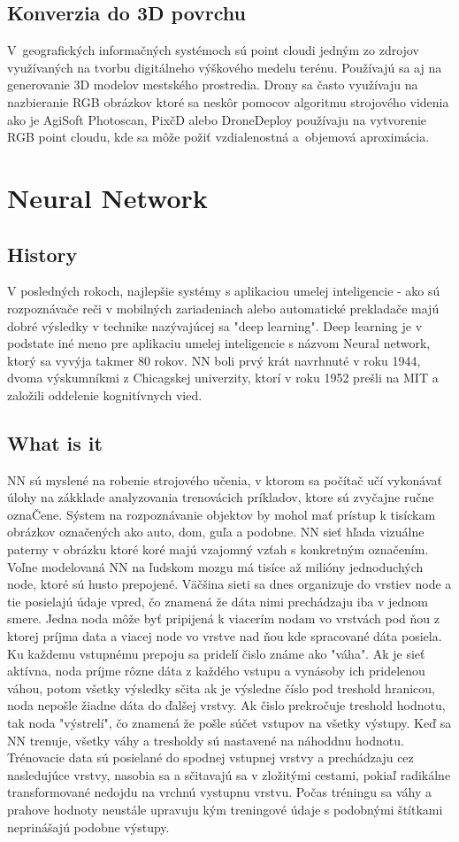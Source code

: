 \subsection{Konverzia do 3D povrchu}
V geografických informačných systémoch sú point cloudi jedným zo zdrojov využívaných na tvorbu digitálneho výškového medelu terénu. Používajú sa aj na generovanie 3D modelov mestského prostredia. Drony sa často využívaju na nazbieranie RGB obrázkov ktoré sa neskôr pomocov algoritmu strojového videnia ako je AgiSoft Photoscan, PixčD alebo DroneDeploy používaju na vytvorenie RGB point cloudu, kde sa môže požiť vzdialenostná a objemová aproximácia.
\section{Neural Network}
\subsection{History}
V posledných rokoch, najlepšie systémy s aplikaciou umelej inteligencie - ako sú rozpoznávače reči v mobilných zariadeniach alebo automatické prekladače majú dobré výsledky v technike nazývajúcej sa "deep learning".
Deep learning je v podstate iné meno pre aplikaciu umelej inteligencie s názvom Neural network, ktorý sa vyvýja takmer 80 rokov. NN boli prvý krát navrhnuté v roku 1944, dvoma výskumníkmi z Chicagskej univerzity, ktorí v roku 1952 prešli na MIT a založili oddelenie kognitívnych vied.
\subsection{What is it}
NN sú myslené na robenie strojového učenia, v ktorom sa počítač učí vykonávať úlohy na zákklade analyzovania trenovácich príkladov, ktore sú zvyčajne ručne oznaČene. Sýstem na rozpoznávanie objektov by mohol mať prístup k tisíckam obrázkov označených ako auto, dom, guľa a podobne. NN sieť hľada vizuálne paterny v obrázku ktoré koré majú vzajomný vzťah s konkretným označením.
Voľne modelovaná NN na ľudskom mozgu má tisíce až milióny jednoduchých node, ktoré sú husto prepojené. Väčšina sieti sa dnes organizuje do vrstiev node a tie posielajú údaje vpred, čo znamená že dáta nimi prechádzaju iba v jednom smere. Jedna noda môže byť pripijená k viacerím nodam vo vrstvách pod ňou z ktorej príjma data a viacej node vo vrstve nad ňou kde spracované dáta posiela.
Ku každemu vstupnému prepoju sa pridelí čislo známe ako "váha". Ak je sieť aktívna, noda príjme rôzne dáta z každého vstupu a vynásoby ich pridelenou váhou, potom všetky výsledky sčita ak je výsledne číslo pod treshold hranicou, noda nepošle žiadne dáta do ďalšej vrstvy. Ak čislo prekročuje treshold hodnotu, tak noda "výstrelí", čo znamená že pošle súčet vstupov na všetky výstupy.
Keď sa NN trenuje, všetky váhy a tresholdy sú nastavené na náhoddnu hodnotu. Trénovacie data sú posielané do spodnej vstupnej vrstvy a prechádzaju cez nasledujúce vrstvy, nasobia sa a sčitavajú sa v zložitými cestami, pokiaľ radikálne transformované nedojdu na vrchnú vystupnu vrstvu. Počas tréningu sa váhy a prahove hodnoty neustále upravuju kým treningové údaje s podobnými štítkami neprinášajú podobne výstupy.

